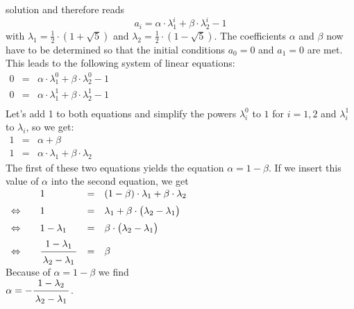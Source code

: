 solution and therefore reads 
\[ a_i = \alpha \cdot \lambda_1^i + \beta \cdot \lambda_2^i - 1 \]
with $\lambda_1 = \frac{1}{2}\cdot (1 + \sqrt{5})$ and $\lambda_2 = \frac{1}{2}\cdot (1 - \sqrt{5})$.
The coefficients $\alpha$ and $\beta$ now have to be determined so that the
initial conditions $a_0 = 0$ and $a_1 = 0$ are met.  This leads to the following
system of linear equations: 
\\[0.2cm]
\hspace*{1.3cm}
$\begin{array}{lcl}
    0 & = & \alpha \cdot \lambda_1^0 + \beta \cdot \lambda_2^0 - 1 \\[0.1cm]
    0 & = & \alpha \cdot \lambda_1^1 + \beta \cdot \lambda_2^1 - 1 \\
  \end{array}
  $
\\[0.2cm]
Let's add 1 to both equations and simplify the powers $\lambda_i^0$ to $1$ for $i=1,2$ and
$\lambda_i^1$ to $\lambda_i$, so we get:
\\[0.2cm]
\hspace*{1.3cm}
$ \begin{array}{lcl}
    1 & = & \alpha + \beta \\[0.1cm]
    1 & = & \alpha \cdot \lambda_1 + \beta \cdot \lambda_2 
  \end{array}
$
\\[0.2cm]
The first of these two equations yields the equation $\alpha = 1 - \beta$.  
If we insert this value of $\alpha$  into the second equation, we get 
\\[0.2cm]
\hspace*{1.3cm}
$
\begin{array}{clcl}
                      &  1 & = & (1 - \beta)\cdot  \lambda_1 + \beta \cdot \lambda_2 \\[0.2cm]
\Leftrightarrow\quad  &  1 & = & 
 \lambda_1  + \beta \cdot \bigl( \lambda_2 - \lambda_1\bigr) \\[0.2cm]
\Leftrightarrow\quad  &  1 - \lambda_1 & = & \beta \cdot \bigl(\lambda_2 - \lambda_1\bigr)  \\[0.2cm]
\Leftrightarrow\quad  &  \bruch{1 - \lambda_1}{\lambda_2 - \lambda_1} & = & \beta 
\end{array}
$
\\[0.2cm]
Because of $\alpha = 1 - \beta$ we find  \\[0.2cm]
\hspace*{1.3cm} $\alpha = - \bruch{1 - \lambda_2}{\lambda_2 - \lambda_1}$. \\[0.2cm]
